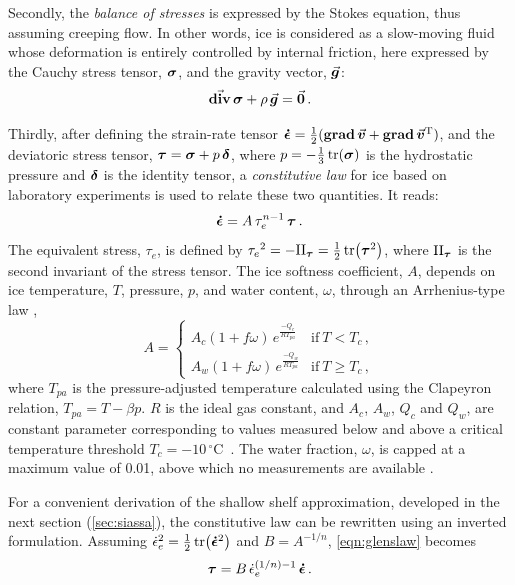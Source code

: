 \documentclass{article}
\newcommand{\vect}[1]{\va*{#1}} %
\newcommand{\tens}[1]{\vb*{#1}} %
\newcommand{\tdiv}[1]{\vect{\mathrm{div}}\,#1}      %
\newcommand{\tgrad}[1]{\tens{\mathrm{grad}}\,#1}    %
\newcommand{\doteps}[0]{\dot{\epsilon}} %
\newcommand{\IDT}[0]{\tens{\delta}}     %
\newcommand{\CST}[0]{\tens{\sigma}}     %
\newcommand{\DST}[0]{\tens{\tau}}       %
\newcommand{\SRT}[0]{\tens{\doteps}}    %
\newcommand{\vv}[0]{\vect{v}}           %
\newcommand{\unit}[1]{\ensuremath{\mathrm{#1}}}
\newcommand{\degree}[0]{\ensuremath{^{\circ}}}
\newcommand{\degC}[0]{\unit{{\degree}C}}
\begin{document}
Secondly, the \emph{balance of stresses} is expressed by the Stokes equation,
thus assuming creeping flow. In other words, ice is considered as a slow-moving
fluid whose deformation is entirely controlled by internal friction, here
expressed by the Cauchy stress tensor, $\CST$, and the gravity vector,
$\vect{g}$:
\begin{equation}
    \label{eqn:stressbalance}
    \tdiv{\CST} + \rho\,\vect{g} = \vect{0} \,.
\end{equation}

Thirdly, after defining the strain-rate tensor
${\SRT = \frac{1}{2}(\tgrad{\vv} + \tgrad{\vv}^{\mathrm{T}})}$,
and the deviatoric stress tensor, ${\DST = \CST + p\,\IDT}$,
where $p=-\frac{1}{3}\tr(\CST)$ is the hydrostatic pressure and
$\tens{\delta}$ is the identity tensor, a \emph{constitutive law} for ice
\citep{Nye.1953} based on laboratory experiments \citep{Glen.1952} is used to
relate these two quantities. It reads:
\begin{equation}
    \label{eqn:glenslaw}
    \SRT = A\,\tau_e^{n-1}\,\DST \,.
\end{equation}
The equivalent stress, $\tau_e$, is defined by
${\tau_e}^2 = -\mathrm{II}_{\DST} = \frac{1}{2} \tr(\DST^2)$,
where $\mathrm{II}_{\DST}$ is the second invariant of the stress tensor.
The ice softness coefficient, $A$, depends on ice temperature, $T$, pressure, $p$, and
water content, $\omega$, through an Arrhenius-type law
\citep[Eqs.~63--65]{Paterson.Budd.1982, Aschwanden.etal.2012},
\begin{equation}
    A =
    \begin{cases}
        A_c (1+f\omega)\,e^\frac{-Q_c}{RT_{pa}}
            & \text{if}\ T < T_c \,, \\
        A_w (1+f\omega)\,e^\frac{-Q_w}{RT_{pa}}
            & \text{if}\ T \ge T_c \,,
    \end{cases}
\end{equation}
where $T_{pa}$ is the pressure-adjusted temperature calculated using the
Clapeyron relation, ${T_{pa} = T - \beta p}$. $R$ is the ideal gas constant,
and $A_c$, $A_w$, $Q_c$ and $Q_w$, are constant parameter corresponding to
values measured below and above a critical temperature threshold
${T_c=-10}$\,\degC\ \citep[\cref{tab:iceflowparams};][]{Paterson.Budd.1982}.
The water fraction, $\omega$, is capped at a maximum value of 0.01, above which
no measurements are available \citep[Eq.~5.7]{Lliboutry.Duval.1985,
Greve.1997}.

For a convenient derivation of the shallow shelf approximation, developed in
the next section (\cref{sec:siassa}), the constitutive law can be rewritten
using an inverted formulation. Assuming
${{\doteps_e}^2 = \frac{1}{2} \tr(\SRT^2)}$ and ${B=A^{-1/n}}$,
\cref{eqn:glenslaw} becomes
\begin{equation}
    \label{eqn:invglenslaw}
    \DST = B\,\doteps_e^{(1/n)-1}\,\SRT \,.
\end{equation}
\end{document}
